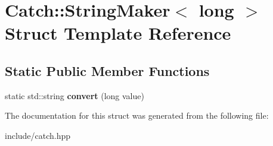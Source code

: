 \hypertarget{structCatch_1_1StringMaker_3_01long_01_4}{}\section{Catch\+:\+:String\+Maker$<$ long $>$ Struct Template Reference}
\label{structCatch_1_1StringMaker_3_01long_01_4}
\subsection*{Static Public Member Functions}
\begin{DoxyCompactItemize}
\item 
static std\+::string {\bfseries convert} (long value)\hypertarget{structCatch_1_1StringMaker_3_01long_01_4_a1c0c56497813e7a6425c5411d5e66447}{}\label{structCatch_1_1StringMaker_3_01long_01_4_a1c0c56497813e7a6425c5411d5e66447}

\end{DoxyCompactItemize}


The documentation for this struct was generated from the following file\+:\begin{DoxyCompactItemize}
\item 
include/catch.\+hpp\end{DoxyCompactItemize}

